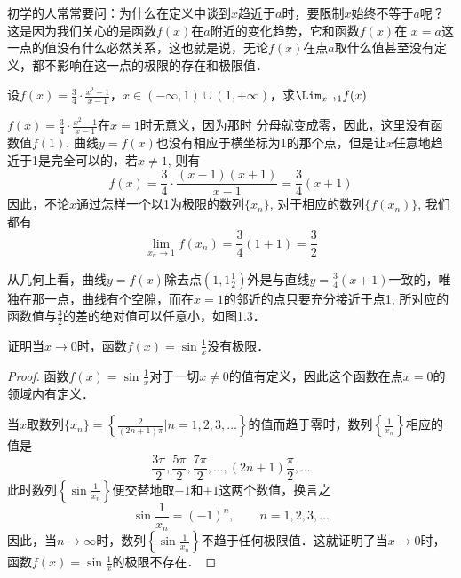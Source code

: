 初学的人常常要问：为什么在定义中谈到$x$趋近于$a$时，要限制$x$始终不等于$a$呢？这是因为我们关心的是函数$f(x)$在$a$附近的变化趋势，它和函数$f(x)$在
$x=a$这一点的值没有什么必然关系，这也就是说，无论$f(x)$在点$a$取什么值甚至没有定义，都不影响在这一点的极限的存在和极限值．

\begin{example}
设$f(x)=\frac{3}{4}\cdot \frac{x^2-1}{x-1}$，$x\in(-\infty,1)\cup(1,+\infty)$，求$\Lim_{x\to 1}f(x)$
\end{example}

\begin{solution}
    $f(x)=\frac{3}{4}\cdot \frac{x^2-1}{x-1}$在$x=1$时无意义，因为那时
    分母就变成零，因此，这里没有函数值$f(1)$, 曲线$y=f(x)$也没有相应于横坐标为1的那个点，但是让$x$任意地趋近于1是完全可以的，若$x\ne 1$, 则有
  \[  f (x) =\frac{3}{4}\cdot  \frac{(x-1)(x+1)}{x-1}=\frac{3}{4}(x+1)\]
  因此，不论$x$通过怎样一个以1为极限的数列$\{x_n\}$, 对于相应的数列$\{f(x_n)\}$, 我们都有
  \[\lim_{x_n\to 1} f (x_n) =\frac{3}{4} (1+1) =\frac{3}{2}\]

    从几何上看，曲线$y=f(x)$除去点$\left(1,1\frac{1}{2}\right)$外是与直线$y=\frac{3}{4}(x+1)$一致的，唯独在那一点，曲线有个空隙，而在$x=1$的邻近的点只要充分接近于点1, 所对应的函数值与$\frac{3}{2}$的差的绝对值可以任意小，如图1.3．
\end{solution}
    
\begin{figure}[htp]
    \centering
{}
    \caption{}
\end{figure}

\begin{example}
证明当$x\to 0$时，函数$f(x)=\sin\frac{1}{x}$没有极限．
\end{example}

\begin{proof}
函数$f(x)=\sin\frac{1}{x}$对于一切$x\ne 0$的值有定义，因此这个函数在点$x=0$的领域内有定义．

当$x$取数列$\{x_n\}=\left\{\frac{2}{(2n+1)\pi}\Big| n=1,2,3,\ldots\right\}$的值而趋于零时，数列$\left\{\frac{1}{x_n}\right\}$相应的值是
\[\frac{3\pi}{2},\frac{5\pi}{2},\frac{7\pi}{2},\ldots,(2n+1)\frac{\pi}{2},\ldots\]
此时数列$\left\{\sin\frac{1}{x_n}\right\}$便交替地取$-1$和$+1$这两个数值，换言之
\[\sin\frac{1}{x_n}=(-1)^n,\qquad n=1,2,3,\ldots\]
因此，当$n\to\infty$时，数列$\left\{\sin\frac{1}{x_n}\right\}$不趋于任何极限值．这就证明了当$x\to 0$时，函数$f(x)=\sin\frac{1}{x}$的极限不存在．
\end{proof}

